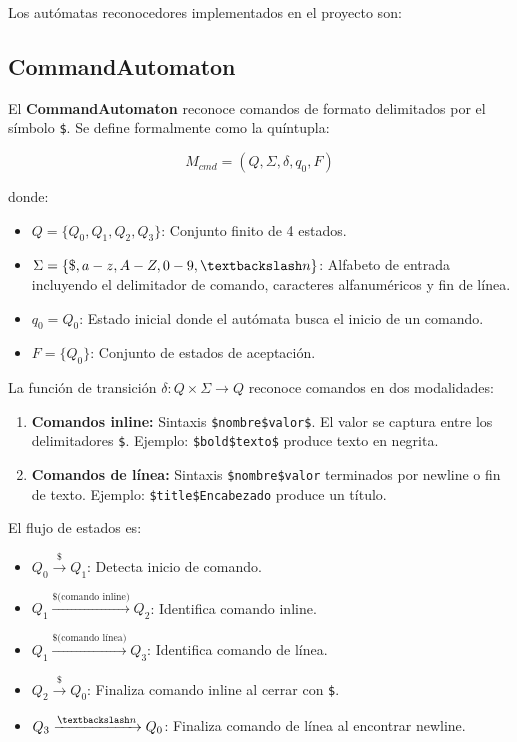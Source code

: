 Los autómatas reconocedores implementados en el proyecto son:

\subsection{CommandAutomaton}

El \textbf{CommandAutomaton} reconoce comandos de formato delimitados por el símbolo \texttt{\$}. Se define formalmente como la quíntupla:

\[
M_{cmd} = (Q, \Sigma, \delta, q_0, F)
\]

donde:

\begin{itemize}
    \item $Q = \{Q_0, Q_1, Q_2, Q_3\}$: Conjunto finito de 4 estados.
    \item $\Sigma = \{\$, a-z, A-Z, 0-9, \textbackslash n\}$: Alfabeto de entrada incluyendo el delimitador de comando, caracteres alfanuméricos y fin de línea.
    \item $q_0 = Q_0$: Estado inicial donde el autómata busca el inicio de un comando.
    \item $F = \{Q_0\}$: Conjunto de estados de aceptación.
\end{itemize}

La función de transición $\delta: Q \times \Sigma \rightarrow Q$ reconoce comandos en dos modalidades:

\begin{enumerate}
    \item \textbf{Comandos inline:} Sintaxis \texttt{\$nombre\$valor\$}. El valor se captura entre los delimitadores \texttt{\$}. Ejemplo: \texttt{\$bold\$texto\$} produce texto en negrita.
    \item \textbf{Comandos de línea:} Sintaxis \texttt{\$nombre\$valor} terminados por newline o fin de texto. Ejemplo: \texttt{\$title\$Encabezado} produce un título.
\end{enumerate}

El flujo de estados es:
\begin{itemize}
    \item $Q_0 \xrightarrow{\$} Q_1$: Detecta inicio de comando.
    \item $Q_1 \xrightarrow{\$ \text{(comando inline)}} Q_2$: Identifica comando inline.
    \item $Q_1 \xrightarrow{\$ \text{(comando línea)}} Q_3$: Identifica comando de línea.
    \item $Q_2 \xrightarrow{\$} Q_0$: Finaliza comando inline al cerrar con \texttt{\$}.
    \item $Q_3 \xrightarrow{\textbackslash n} Q_0$: Finaliza comando de línea al encontrar newline.
\end{itemize}


